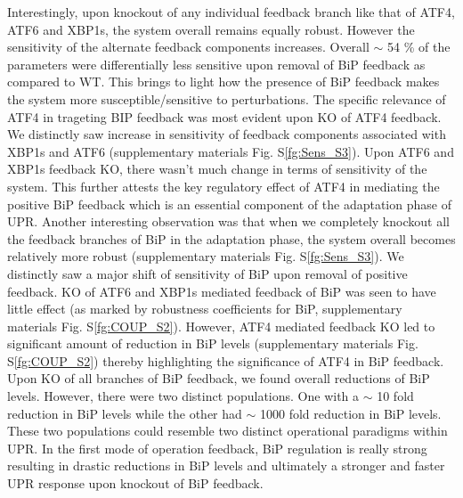\documentclass[fleqn,10pt]{wlscirep}
\begin{document}
Interestingly, upon knockout of any individual feedback branch like that of ATF4, ATF6 and XBP1s, the system overall remains equally robust. However the sensitivity of the alternate feedback components increases. Overall $\sim$ 54 \% of the parameters were differentially less sensitive upon removal of BiP feedback as compared to WT. This brings to light how the presence of BiP feedback makes the system more susceptible/sensitive to perturbations. The specific relevance of ATF4 in trageting BIP feedback was most evident upon KO of ATF4 feedback. We distinctly saw increase in sensitivity of feedback components associated with XBP1s and ATF6 (supplementary materials Fig. S\ref{fg:Sens_S3}). Upon ATF6 and XBP1s feedback KO, there wasn't much change in terms of sensitivity of the system. This further attests the key regulatory effect of ATF4 in mediating the positive BiP feedback which is an essential component of the adaptation phase of UPR. Another interesting observation was that when we completely knockout all the feedback branches of BiP in the adaptation phase, the system overall becomes relatively more robust (supplementary materials Fig. S\ref{fg:Sens_S3}). We distinctly saw a major shift of sensitivity of BiP upon removal of positive feedback. KO of ATF6 and XBP1s mediated feedback of BiP was seen to have little effect (as marked by robustness coefficients for BiP, supplementary materials Fig. S\ref{fg:COUP_S2}). However, ATF4 mediated feedback KO led to significant amount of reduction in BiP levels (supplementary materials Fig. S\ref{fg:COUP_S2}) thereby highlighting the significance of ATF4 in BiP feedback. Upon KO of all branches of BiP feedback, we found overall reductions of BiP levels. However, there were two distinct populations. One with a $\sim$ 10 fold reduction in BiP levels while the other had $\sim$ 1000 fold reduction in BiP levels. These two populations could resemble two distinct operational paradigms within UPR. In the first mode of operation feedback, BiP regulation is really strong resulting in drastic reductions in BiP levels and ultimately a stronger and faster UPR response upon knockout of BiP feedback.
\end{document}

